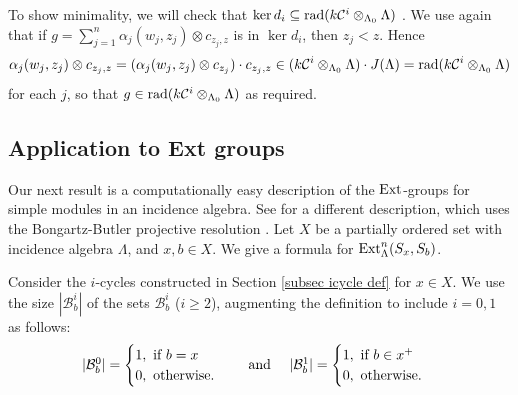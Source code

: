 \documentclass[preprint,review,12pt]{elsarticle}
\newcommand{\Ext}{{\textnormal{Ext}}}
\newcommand{\rad}{{\textnormal{rad}}}
\newcommand{\C}{{\mathcal C}}
\newcommand{\B}{{\mathcal B}}
\begin{document}
\begin{pf}
To show minimality, we will check that $\ker d_i\subseteq \rad (k\C^i\otimes_{\Lambda_0} \Lambda)$ \cite[Lemma VIII.2.1]{A97}.  We use again that if $g = \sum_{j=1}^n\alpha_j(w_j,z_j)\otimes c_{z_j,z}$ is in $\ker d_i$, then $z_j<z$.   Hence 
	$$\alpha_j(w_j,z_j)\otimes c_{z_j,z} = (\alpha_j(w_j,z_j)\otimes c_{z_j})\cdot c_{z_j,z}\in (k\C^i\otimes_{\Lambda_0} \Lambda)\cdot J(\Lambda) = \rad (k\C^i\otimes_{\Lambda_0} \Lambda)$$
for each $j$, so that $g\in \rad (k\C^i\otimes_{\Lambda_0} \Lambda)$ as required.
\end{pf}

\subsection{Application to Ext groups}\label{subsec Ext groups}
Our next result is a computationally easy description of the $\Ext$-groups for simple modules in an incidence algebra.  See \cite[Proposition 3.6]{C89} for a different description, which uses the Bongartz-Butler projective resolution \cite[Section 1.1]{B83}. Let $X$ be a partially ordered set with incidence algebra $\Lambda$, and $x,b\in X$.  We give a formula for $\Ext_{\Lambda}^n(S_x,S_b)$.

Consider the $i$-cycles constructed in Section \ref{subsec icycle def} for $x\in X$.  We use the size $|\B^i_b|$ of the sets $\B^i_b$ ($i\geqslant 2$), augmenting the definition to include $i=0,1$ as follows:
   	$$\begin{array}{r c l}
    |\B^{0}_b|=\begin{cases}
		1,\textnormal{ if } b=x \\
		0,\textnormal{ otherwise.}
	\end{cases} &\textnormal{ and } &
	|\B^{1}_b|=\begin{cases}
	1,\textnormal{ if } b\in x^+\\
	0,\textnormal{ otherwise.}
	\end{cases}
	\end{array}$$
\end{document}
